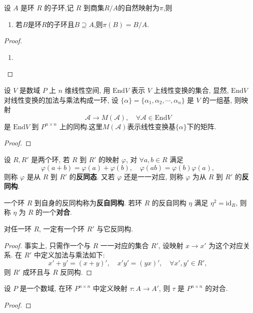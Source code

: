 \documentclass[../../main.tex]{subfiles}%
\begin{document}
\begin{proposition}\label{proposition:环的自然同态的基本性质}
设 \( A \) 是环 \( R \) 的子环,记 \( R \) 到商集\( R/A \)的自然映射为$\pi$,则
\begin{enumerate}[(1)]
\item\label{proposition:环的自然同态的基本性质-1} 若$B$是环$R$的子环且$B\supseteq A$,则$\pi(B)=B/A.$

\end{enumerate}
\end{proposition}
\begin{proof}
\begin{enumerate}[(1)]
\item 

\end{enumerate}
\end{proof}

\begin{example}
设 \( V \) 是数域 \( P \) 上 \( n \) 维线性空间, 用 \( \text{End}V \) 表示 \( V \) 上线性变换的集合, 显然, \( \text{End}V \) 对线性变换的加法与乘法构成一环, 设 \( \{\alpha\} = \{\alpha_1, \alpha_2, \cdots, \alpha_n\} \) 是 \( V \) 的一组基, 则映射
\[
\mathcal{A} \to M(\mathcal{A}), \quad \forall \mathcal{A} \in \text{End}V
\]
是 \( \text{End}V \) 到 \( P^{n \times n} \) 上的同构.这里$M(\mathcal{A})$表示线性变换基$\{\alpha\}$下的矩阵.
\end{example}
\begin{proof}

\end{proof}

\begin{definition}
设 \( R, R' \) 是两个环, 若 \( R \) 到 \( R' \) 的映射 \( \varphi \), 对 \( \forall a,b \in R \) 满足
\[
\varphi(a + b) = \varphi(a) + \varphi(b), \quad \varphi(ab) = \varphi(b)\varphi(a),
\]
则称 \( \varphi \) 是从 \( R \) 到 \( R' \) 的\textbf{反同态}. 又若 \( \varphi \) 还是一一对应, 则称 \( \varphi \) 为从 \( R \) 到 \( R' \) 的\textbf{反同构}.

一个环 \( R \) 到自身的反同构称为\textbf{反自同构}. 若环 \( R \) 的反自同构 \( \eta \) 满足 \( \eta^2 = \text{id}_R \), 则称 \( \eta \) 为 \( R \) 的一个\textbf{对合}.
\end{definition}

\begin{theorem}
对任一环 \( R \), 一定有一个环 \( R' \) 与它反同构.
\end{theorem}
\begin{proof}
事实上, 只需作一个与 \( R \) 一一对应的集合 \( R' \), 设映射 \( x \to x' \) 为这个对应关系. 在 \( R' \) 中定义加法与乘法如下:
\[
x' + y' = (x + y)', \quad x'y' = (yx)', \quad \forall x', y' \in R',
\]
则 \( R' \) 成环且与 \( R \) 反同构.
\end{proof}

\begin{example}
设 \( P \) 是一个数域, 在环 \( P^{n \times n} \) 中定义映射 \( \tau: A \to A' \), 则 \( \tau \) 是 \( P^{n \times n} \) 的对合.
\end{example}
\begin{proof}

\end{proof}
\end{document}
